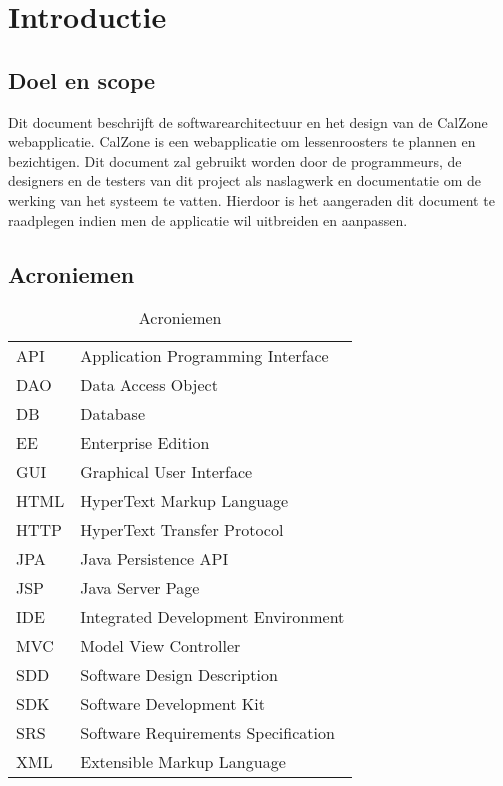 \chapter{Introductie}

\section{Doel en scope}
Dit document beschrijft de softwarearchitectuur en het design van de CalZone webapplicatie.
CalZone is een webapplicatie om lessenroosters te plannen en bezichtigen.
Dit document zal gebruikt worden door de programmeurs, de designers en de testers van dit project als naslagwerk en documentatie om de werking van het systeem te vatten. 
Hierdoor is het aangeraden dit document te raadplegen indien men de applicatie wil uitbreiden en aanpassen.


\section{Acroniemen}

\begin{table}[H]
	\centering
	\caption{Acroniemen}
	\label{tab:Acroniemen}
	\begin{tabular}{l | l}
	
	API	& Application Programming Interface\\
	
	DAO	& Data Access Object\\

	DB	& Database\\
	
	EE	& Enterprise Edition\\

	GUI	& Graphical User Interface\\
	
	HTML	& HyperText Markup Language\\
	
	HTTP	& HyperText Transfer Protocol\\
	
	JPA	& Java Persistence API\\

	JSP & Java Server Page\\
	
	IDE	& Integrated Development Environment\\

	MVC & Model View Controller\\ 

	SDD	& Software Design Description\\

	SDK	& Software Development Kit\\

	SRS	& Software Requirements Specification\\
	
	XML & Extensible Markup Language\\
	
	\end{tabular}
\end{table}


